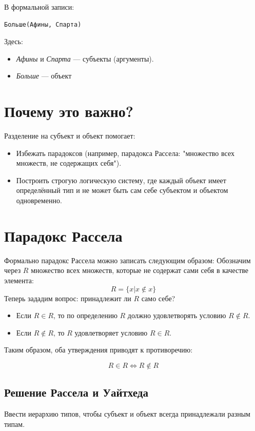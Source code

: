 \documentclass[a4paper, 12pt]{article}
\begin{document}
В формальной записи:
\begin{verbatim}
Больше(Афины, Спарта)
\end{verbatim}

Здесь:
\begin{itemize} 
 \item \textit{Афины} и \textit{Спарта} — субъекты (аргументы).
 \item \textit{Больше} — объект
\end{itemize} 

\section{Почему это важно?}
Разделение на субъект и объект помогает:
\begin{itemize} 
	\item Избежать парадоксов (например, парадокса Рассела: "множество всех множеств, не содержащих себя").

	\item Построить строгую логическую систему, где каждый объект имеет определённый тип и не может быть сам себе субъектом и объектом одновременно.
\end{itemize} 

\section{Парадокс Рассела}
Формально парадокс Рассела можно записать следующим образом:
Обозначим через $R$ множество всех множеств, которые не содержат сами себя в качестве элемента:
\[R = \lbrace x | x \notin x \rbrace\]
Теперь зададим вопрос: принадлежит ли $R$ само себе?

\begin{itemize} 
 \item Если $R \in R$, то по определению $R$ должно удовлетворять условию $R \notin R$.
 \item Если $R \notin R$, то $R$ удовлетворяет условию $R \in R$.
\end{itemize} 

Таким образом, оба утверждения приводят к противоречию:

\[ R \in R \Leftrightarrow R \notin R \]

\subsection{Решение Рассела и Уайтхеда}
Ввести иерархию типов, чтобы субъект и объект всегда принадлежали разным типам. 
\end{document}

